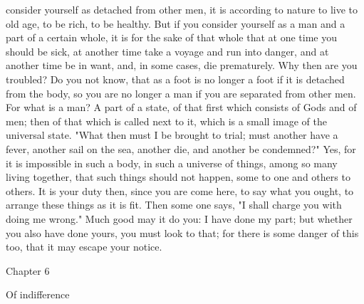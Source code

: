 \documentclass[a4paper]{article}
\begin{document}
consider yourself as detached from other men, it is according to nature to live
to old age, to be rich, to be healthy. But if you consider yourself as a man
and a part of a certain whole, it is for the sake of that whole that at one
time you should be sick, at another time take a voyage and run into danger, and
at another time be in want, and, in some cases, die prematurely. Why then are
you troubled? Do you not know, that as a foot is no longer a foot if it is
detached from the body, so you are no longer a man if you are separated from
other men. For what is a man? A part of a state, of that first which consists
of Gods and of men; then of that which is called next to it, which is a small
image of the universal state. "What then must I be brought to trial; must
another have a fever, another sail on the sea, another die, and another be
condemned?" Yes, for it is impossible in such a body, in such a universe of
things, among so many living together, that such things should not happen, some
to one and others to others. It is your duty then, since you are come here, to
say what you ought, to arrange these things as it is fit. Then some one says,
"I shall charge you with doing me wrong." Much good may it do you: I have done
my part; but whether you also have done yours, you must look to that; for there
is some danger of this too, that it may escape your notice.

Chapter 6

Of indifference
\end{document}
